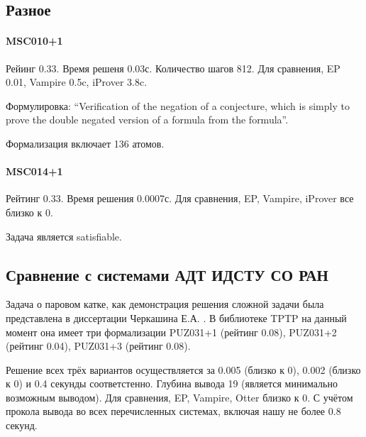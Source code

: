 \subsection{Разное}





\paragraph{MSC010+1}
Рейинг 0.33. Время решеня 0.03с. Количество шагов 812. Для сравнения, EP 0.01, Vampire 0.5c, iProver 3.8c.

Формулировка: ``Verification of the negation of a conjecture, which is simply to prove the double negated version of a formula from the formula''.

Формализация включает 136 атомов.



\paragraph{MSC014+1}
Рейтинг 0.33. Время решения 0.0007с. Для сравнения, EP, Vampire, iProver все близко к 0.

Задача является satisfiable.

\subsection{Сравнение с системами АДТ ИДСТУ СО РАН}
Задача о паровом катке, как демонстрация решения сложной задачи была представлена в диссертации Черкашина Е.А. \cite{dissChe}.
В библиотеке TPTP на данный момент она имеет три формализации PUZ031+1 (рейтинг 0.08), PUZ031+2 (рейтинг 0.04), PUZ031+3 (рейтинг 0.08).

Решение всех трёх вариантов осуществляется за 0.005 (близко к 0), 0.002 (близко к 0) и 0.4 секунды соответстенно. Глубина вывода 19 (является минимально возможным выводом). Для сравнения, EP, Vampire, Otter близко к 0. С учётом прокола вывода во всех перечисленных системах, включая нашу не более 0.8 секунд.

